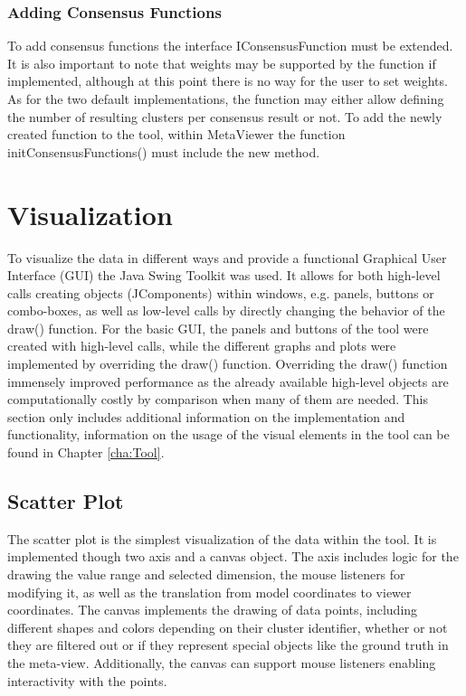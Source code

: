 \documentclass[
	a4paper,
	english,
	twoside,
	openright,               
	11pt                            
	]{report}
\begin{document}
\subsubsection*{Adding Consensus Functions}
To add consensus functions the interface IConsensusFunction must be extended. It is also important to note that weights may be supported by the function if implemented, although at this point there is no way for the user to set weights. As for the two default implementations, the function may either allow defining the number of resulting clusters per consensus result or not. To add the newly created function to the tool, within MetaViewer the function initConsensusFunctions() must include the new method.

\section{Visualization}

To visualize the data in different ways and provide a functional Graphical User Interface (GUI) the Java Swing \cite{javaswing} Toolkit was used. It allows for both high-level calls creating objects (JComponents) within windows, e.g. panels, buttons or combo-boxes, as well as low-level calls by directly changing the behavior of the draw() function. For the basic GUI, the panels and buttons of the tool were created with high-level calls, while the different graphs and plots were implemented by overriding the draw() function. Overriding the draw() function immensely improved performance as the already available high-level objects are computationally costly by comparison when many of them are needed. This section only includes additional information on the implementation and functionality, information on the usage of the visual elements in the tool can be found in Chapter \ref{cha:Tool}.

\subsection{Scatter Plot}
The scatter plot is the simplest visualization of the data within the tool. It is implemented though two axis and a canvas object. The axis includes logic for the drawing the value range and selected dimension, the mouse listeners for modifying it, as well as the translation from model coordinates to viewer coordinates. The canvas implements the drawing of data points, including different shapes and colors depending on their cluster identifier, whether or not they are filtered out or if they represent special objects like the ground truth in the meta-view. Additionally, the canvas can support mouse listeners enabling interactivity with the points.
\end{document}
